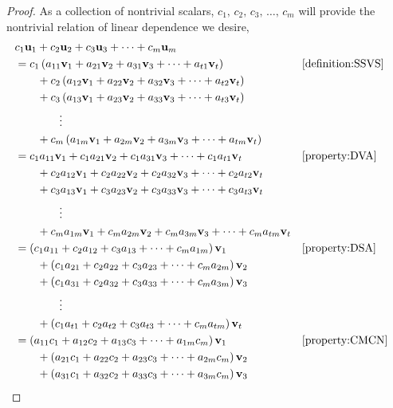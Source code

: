 \documentclass{ximera}
\begin{document}
\begin{theorem}
\begin{proof}
  As a collection of nontrivial scalars,
  $c_1,\,c_2,\,c_3,\,\dots,\,c_m$ will provide the nontrivial relation
  of linear dependence we desire,
  \begin{align*}
    &\lincombo{c}{u}{m}\\
    &=c_{1}\left(a_{11}\vect{v}_1+a_{21}\vect{v}_2+a_{31}\vect{v}_3+\cdots+a_{t1}\vect{v}_t\right)
    &&\ref{definition:SSVS}\\
    &\quad\quad+c_{2}\left(a_{12}\vect{v}_1+a_{22}\vect{v}_2+a_{32}\vect{v}_3+\cdots+a_{t2}\vect{v}_t\right)\\
    &\quad\quad+c_{3}\left(a_{13}\vect{v}_1+a_{23}\vect{v}_2+a_{33}\vect{v}_3+\cdots+a_{t3}\vect{v}_t\right)\\
    &\quad\quad\quad\quad\vdots\\
    &\quad\quad+c_{m}\left(a_{1m}\vect{v}_1+a_{2m}\vect{v}_2+a_{3m}\vect{v}_3+\cdots+a_{tm}\vect{v}_t\right)\\
    &=c_{1}a_{11}\vect{v}_1+c_{1}a_{21}\vect{v}_2+c_{1}a_{31}\vect{v}_3+\cdots+c_{1}a_{t1}\vect{v}_t
    &&\ref{property:DVA}\\
    &\quad\quad+c_{2}a_{12}\vect{v}_1+c_{2}a_{22}\vect{v}_2+c_{2}a_{32}\vect{v}_3+\cdots+c_{2}a_{t2}\vect{v}_t\\
    &\quad\quad+c_{3}a_{13}\vect{v}_1+c_{3}a_{23}\vect{v}_2+c_{3}a_{33}\vect{v}_3+\cdots+c_{3}a_{t3}\vect{v}_t\\
    &\quad\quad\quad\quad\vdots\\
    &\quad\quad+c_{m}a_{1m}\vect{v}_1+c_{m}a_{2m}\vect{v}_2+c_{m}a_{3m}\vect{v}_3+\cdots+c_{m}a_{tm}\vect{v}_t\\
    &=\left(c_{1}a_{11}+c_{2}a_{12}+c_{3}a_{13}+\cdots+c_{m}a_{1m}\right)\vect{v}_1
    &&\ref{property:DSA}\\
    &\quad\quad+\left(c_{1}a_{21}+c_{2}a_{22}+c_{3}a_{23}+\cdots+c_{m}a_{2m}\right)\vect{v}_2\\
    &\quad\quad+\left(c_{1}a_{31}+c_{2}a_{32}+c_{3}a_{33}+\cdots+c_{m}a_{3m}\right)\vect{v}_3\\
    &\quad\quad\quad\quad\vdots\\
    &\quad\quad+\left(c_{1}a_{t1}+c_{2}a_{t2}+c_{3}a_{t3}+\cdots+c_{m}a_{tm}\right)\vect{v}_t\\
    &=\left(a_{11}c_{1}+a_{12}c_{2}+a_{13}c_{3}+\cdots+a_{1m}c_{m}\right)\vect{v}_1
    &&\ref{property:CMCN}\\
    &\quad\quad+\left(a_{21}c_{1}+a_{22}c_{2}+a_{23}c_{3}+\cdots+a_{2m}c_{m}\right)\vect{v}_2\\
    &\quad\quad+\left(a_{31}c_{1}+a_{32}c_{2}+a_{33}c_{3}+\cdots+a_{3m}c_{m}\right)\vect{v}_3\\

\end{align*}
\end{proof}
\end{theorem}
\end{document}
